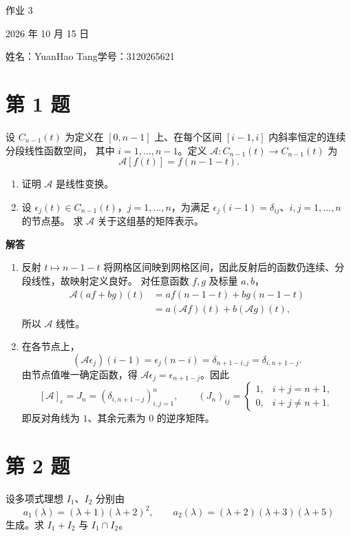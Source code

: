 \documentclass[UTF8,10pt,letterpaper,fontset=fandol]{ctexart}
\newcommand{\Solution}{\par\Needspace{4\baselineskip}\textbf{解答}\par}
\begin{document}
\begin{center}
{\LARGE 作业 3}\par
\vspace{0.6em}
2026 年 10 月 15 日\par
姓名：YuanHao Tang\quad 学号：3120265621
\end{center}

\section{第 1 题}
设 \(C_{n-1}(t)\) 为定义在 \([0,n-1]\) 上、在每个区间 \([i-1,i]\) 内斜率恒定的连续分段线性函数空间，
其中 \(i=1,\ldots,n-1\)。定义 \(\mathcal A:C_{n-1}(t)\to C_{n-1}(t)\) 为
\[
\mathcal A[f(t)]=f(n-1-t).
\]
\begin{enumerate}
\item 证明 \(\mathcal A\) 是线性变换。
\item 设 \(\epsilon_j(t)\in C_{n-1}(t)\)，\(j=1,\ldots,n\)，为满足
\(\epsilon_j(i-1)=\delta_{ij}\)、\(i,j=1,\ldots,n\) 的节点基。
求 \(\mathcal A\) 关于这组基的矩阵表示。
\end{enumerate}

\Solution
\begin{enumerate}
\item 反射 \(t\mapsto n-1-t\) 将网格区间映到网格区间，因此反射后的函数仍连续、分段线性，故映射定义良好。
对任意函数 \(f,g\) 及标量 \(a,b\)，
\[
\begin{aligned}
\mathcal A(af+bg)(t)&=a f(n-1-t)+b g(n-1-t)\\
&=a(\mathcal Af)(t)+b(\mathcal Ag)(t),
\end{aligned}
\]
所以 \(\mathcal A\) 线性。
\item 在各节点上，
\[
(\mathcal A\epsilon_j)(i-1)=\epsilon_j(n-i)=\delta_{n+1-i,j}=\delta_{i,n+1-j}.
\]
由节点值唯一确定函数，得 \(\mathcal A\epsilon_j=\epsilon_{n+1-j}\)。因此
\[
\boxed{[\mathcal A]_{\epsilon}=J_n=(\delta_{i,n+1-j})_{i,j=1}^n},\qquad
(J_n)_{ij}=\begin{cases}1,&i+j=n+1,\\0,&i+j\ne n+1.\end{cases}
\]
即反对角线为 \(1\)、其余元素为 \(0\) 的逆序矩阵。
\end{enumerate}

\section{第 2 题}
设多项式理想 \(I_1\)、\(I_2\) 分别由
\[
a_1(\lambda)=(\lambda+1)(\lambda+2)^2,\qquad
a_2(\lambda)=(\lambda+2)(\lambda+3)(\lambda+5)
\]
生成。求 \(I_1+I_2\) 与 \(I_1\cap I_2\)。
\end{document}
